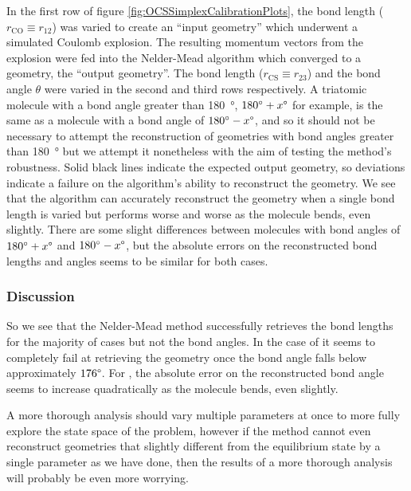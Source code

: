 In the first row of figure \ref{fig:OCSSimplexCalibrationPlots}, the  bond length ($r_\textrm{CO}\equiv r_{12}$) was varied to create an ``input geometry'' which underwent a simulated Coulomb explosion. The resulting momentum vectors from the explosion were fed into the Nelder-Mead algorithm which converged to a geometry, the ``output geometry''. The  bond length ($r_\textrm{CS}\equiv r_{23}$) and the bond angle $\theta$ were varied in the second and third rows respectively. A triatomic molecule with a bond angle greater than \SI{180}{\degree}, $\SI{180}{\degree} + x\degree$ for example, is the same as a molecule with a bond angle of $\SI{180}{\degree} - x\degree$, and so it should not be necessary to attempt the reconstruction of geometries with bond angles greater than \SI{180}{\degree} but we attempt it nonetheless with the aim of testing the method's robustness. Solid black lines indicate the expected output geometry, so deviations indicate a failure on the algorithm's ability to reconstruct the geometry. We see that the algorithm can accurately reconstruct the geometry when a single bond length is varied but performs worse and worse as the molecule bends, even slightly. There are some slight differences between molecules with bond angles of $\SI{180}{\degree} + x\degree$ and $\SI{180}{\degree} - x\degree$, but the absolute errors on the reconstructed bond lengths and angles seems to be similar for both cases.

\subsubsection*{Discussion}
So we see that the Nelder-Mead method successfully retrieves the bond lengths for the majority of cases but not the bond angles. In the case of  it seems to completely fail at retrieving the geometry once the bond angle falls below approximately $176\degree$. For , the absolute error on the reconstructed bond angle seems to increase quadratically as the molecule bends, even slightly.

A more thorough analysis should vary multiple parameters at once to more fully explore the state space of the problem, however if the method cannot even reconstruct geometries that slightly different from the equilibrium state by a single parameter as we have done, then the results of a more thorough analysis will probably be even more worrying.

